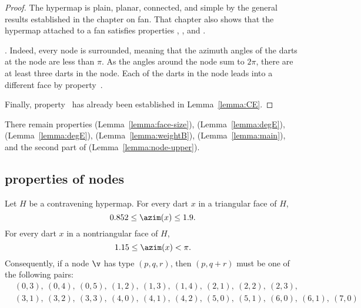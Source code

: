 \begin{proof}
  The hypermap is plain, planar, connected, and simple by the general
  results established in the chapter on fan.  That chapter also shows
  that the hypermap attached to a fan satisfies properties
  , , and .

  .  Indeed, every node is
  surrounded, meaning that the azimuth angles of the darts at the
  node are less than $\pi$.  As the angles around the node sum to
  $2\pi$, there are at least three darts in the node. Each of the
  darts in the node leads into a different face by
  property~.

  Finally, property~ has already been established in
  Lemma~\ref{lemma:CE}.
\end{proof}

There remain properties 
(Lemma~\ref{lemma:face-size}), %
 (Lemma~\ref{lemma:degE}), 
(Lemma~\ref{lemma:degE}), 
(Lemma~\ref{lemma:weightB}), 
(Lemma~\ref{lemma:main}), and the second part of 
(Lemma~\ref{lemma:node-upper}).


\subsection{properties of nodes}
%



\begin{lemma}[] \label{lemma:0.852}
Let $H$ be a contravening
hypermap. For every dart $x$ in a triangular face of $H$,
\begin{displaymath}0.852\le \azim(x)\le 1.9.\end{displaymath}
For every dart $x$ in a nontriangular face of $H$, 
\begin{displaymath}1.15\le\azim(x)<\pi.\end{displaymath}
%
%
Consequently, if a node $\v$ has type $(p,q,r)$, then $(p,q+r)$
must be one of the following pairs:
\begin{displaymath}
\begin{array}{lll}
  &(0,3),~(0,4),~(0,5),~(1,2),~(1,3),~(1,4),~(2,1),~(2,2),~(2,3),\\
  &(3,1),~(3,2),~(3,3),~(4,0),~(4,1),~(4,2),
  ~(5,0),~(5,1),~(6,0),~(6,1),~(7,0)
\end{array}
\end{displaymath}
\end{lemma}
%

